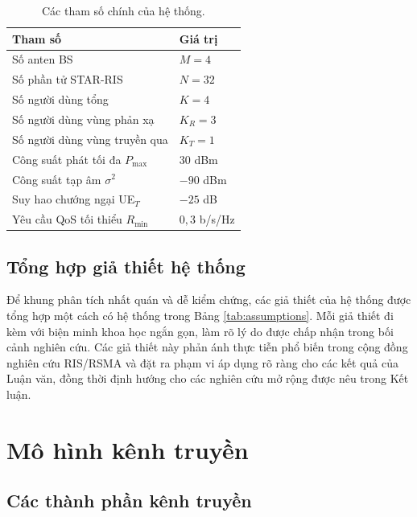 \begin{table}[t]
\centering
\caption{Các tham số chính của hệ thống.}
\label{tab:he_thong_param}
\begin{tabular}{p{6cm} l}
\toprule
\textbf{Tham số} & \textbf{Giá trị} \\
\midrule
Số anten BS                                   & $M=4$ \\
Số phần tử STAR-RIS                           & $N=32$ \\
Số người dùng tổng                            & $K=4$ \\
Số người dùng vùng phản xạ                    & $K_R=3$ \\
Số người dùng vùng truyền qua                 & $K_T=1$ \\
Công suất phát tối đa $P_{\max}$              & $30$ dBm \\
Công suất tạp âm $\sigma^2$                   & $-90$ dBm \\
Suy hao chướng ngại UE$_T$                    & $-25$ dB \\
Yêu cầu QoS tối thiểu $R_{\min}$              & $0{,}3$ b/s/Hz \\
\bottomrule
\end{tabular}
\end{table}

\subsection{Tổng hợp giả thiết hệ thống}
\label{sec:assumptions}

Để khung phân tích nhất quán và dễ kiểm chứng, các giả thiết của hệ
thống được tổng hợp một cách có hệ thống trong Bảng
\ref{tab:assumptions}. Mỗi giả thiết đi kèm với biện minh khoa học
ngắn gọn, làm rõ lý do được chấp nhận trong bối cảnh nghiên cứu. Các
giả thiết này phản ánh thực tiễn phổ biến trong cộng đồng nghiên cứu
RIS/RSMA và đặt ra phạm vi áp dụng rõ ràng cho các kết quả của Luận
văn, đồng thời định hướng cho các nghiên cứu mở rộng được nêu trong
Kết luận.



\section{Mô hình kênh truyền}
\label{sec:kenh}

\subsection{Các thành phần kênh truyền}

